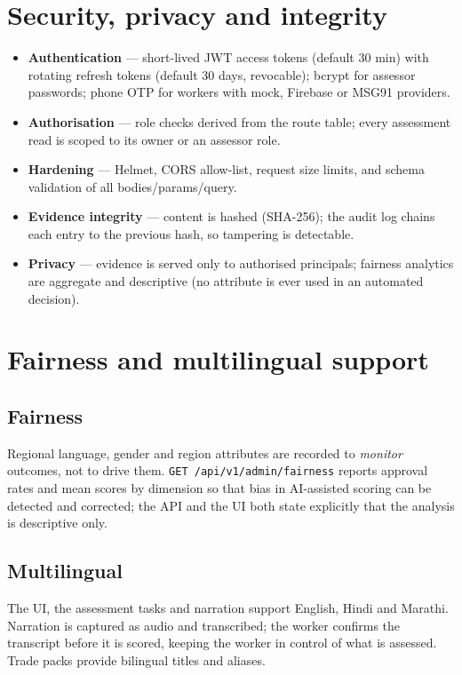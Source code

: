 \documentclass[11pt,a4paper]{article}
\newcommand{\code}[1]{\texttt{\small #1}}
\begin{document}
\section{Security, privacy and integrity}
\begin{itemize}
\item \textbf{Authentication} --- short-lived JWT access tokens (default 30
      min) with rotating refresh tokens (default 30 days, revocable);
      bcrypt for assessor passwords; phone OTP for workers with mock,
      Firebase or MSG91 providers.
\item \textbf{Authorisation} --- role checks derived from the route table;
      every assessment read is scoped to its owner or an assessor role.
\item \textbf{Hardening} --- Helmet, CORS allow-list, request size limits,
      and schema validation of all bodies/params/query.
\item \textbf{Evidence integrity} --- content is hashed (SHA-256); the audit
      log chains each entry to the previous hash, so tampering is detectable.
\item \textbf{Privacy} --- evidence is served only to authorised principals;
      fairness analytics are aggregate and descriptive (no attribute is ever
      used in an automated decision).
\end{itemize}

\section{Fairness and multilingual support}
\subsection{Fairness}
Regional language, gender and region attributes are recorded to
\emph{monitor} outcomes, not to drive them. \code{GET
/api/v1/admin/fairness} reports approval rates and mean scores by dimension
so that bias in AI-assisted scoring can be detected and corrected; the API
and the UI both state explicitly that the analysis is descriptive only.

\subsection{Multilingual}
The UI, the assessment tasks and narration support English, Hindi and Marathi.
Narration is captured as audio and transcribed; the worker confirms the
transcript before it is scored, keeping the worker in control of what is
assessed. Trade packs provide bilingual titles and aliases.
\end{document}
